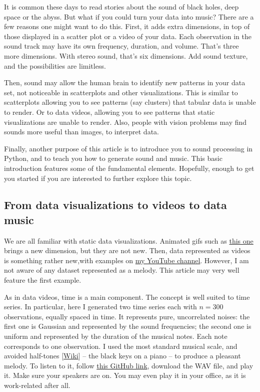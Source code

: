 \documentclass[oneside,10pt]{book}
\begin{document}
It is common these days to read stories about the sound of black holes, deep space or the abyss. But what if you could turn your data into music? There are a few reasons one might want to do this. First, it adds extra dimensions, in top of those displayed in a scatter plot or a video of your data. Each observation in the sound track may have its own frequency, duration, and volume. That’s three more dimensions. With stereo sound, that’s six dimensions. Add sound texture, and the possibilities are limitless.

Then, sound may allow the human brain to identify new patterns in your data set, not noticeable in scatterplots and other visualizations. This is similar to scatterplots allowing you to see patterns (say clusters) that tabular data is unable to render. Or to data videos, allowing you to see patterns that static visualizations are unable to render. Also, people with vision problems may find sounds more useful than images, to interpret data.

Finally, another purpose of this article is to introduce you to sound processing in Python, and to teach you how to generate sound and music. This basic introduction features some of the fundamental elements. Hopefully, enough to get you started if you are interested to further explore this topic.

\subsection{From data visualizations to videos to data music}

We are all familiar with static data visualizations. Animated gifs such as \href{https://mltechniques.com/2022/04/20/computer-vision-shape-classification-via-explainable-ai/}{this one} brings a new dimension, but they are not new. Then, data represented as videos is something rather new,with examples on \href{https://www.youtube.com/c/VincentGranvilleVideos}{my YouTube channel}. However, I am not aware of any dataset represented as a melody. This article may very well feature the first example.

As in data videos, time is a main component. The concept is well suited to time series. In particular, here I generated two time series each with 
$n = 300$ observations, equally spaced in time. It represents pure, uncorrelated noises: the first one is Gaussian and represented by the sound frequencies; the second one is uniform and represented by the duration of the musical notes. Each note corresponds to one observation. I used the most standard musical scale, and avoided \textcolor{index}{half-tones} [\href{https://en.wikipedia.org/wiki/Semitone}{Wiki}] -- the black keys on a piano -- to produce a pleasant melody. To listen to it, follow \href{https://github.com/VincentGranville/Machine-Learning/blob/main/Images/sound.wav}{this GitHub link}, download the WAV file, and play it. Make sure your speakers are on. You may even play it in your office, as it is work-related after all.
\end{document}
